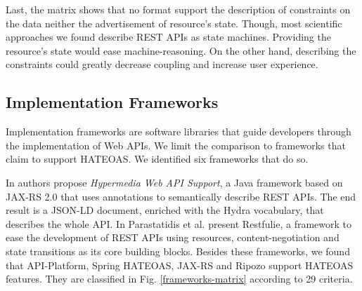 Last, the matrix shows that no format support the description of constraints on the data neither the advertisement of resource's state. Though, most scientific approaches we found describe REST APIs as state machines. Providing the resource's state would ease machine-reasoning. On the other hand, describing the constraints could greatly decrease coupling and increase user experience.

\subsection{Implementation Frameworks}

Implementation frameworks are software libraries that guide developers through the implementation of Web APIs. We limit the comparison to frameworks that claim to support HATEOAS. We identified six frameworks that do so.

In \cite{salvadori2014framework} authors propose \textit{Hypermedia Web API Support}, a Java framework based on JAX-RS 2.0 that uses annotations to semantically describe REST APIs. The end result is a JSON-LD document, enriched with the Hydra vocabulary, that describes the whole API. In \cite{parastatidis2010role} Parastatidis et al. present Restfulie, a framework to ease the development of REST APIs using resources, content-negotiation and state transitions as its core building blocks. Besides these frameworks, we found that API-Platform, Spring HATEOAS, JAX-RS and Ripozo support HATEOAS features. They are classified in Fig. \ref{frameworks-matrix} according to 29 criteria.

